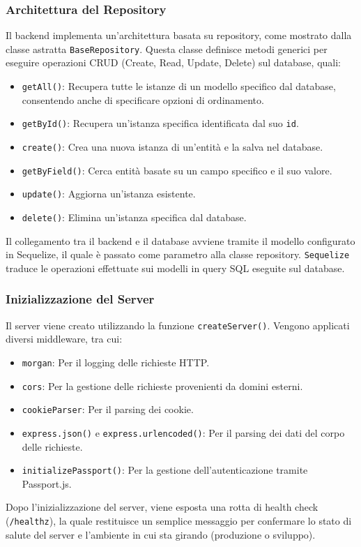 \documentclass[twoside]{supsistudent}
\begin{document}
\subsubsection{Architettura del Repository}
Il backend implementa un'architettura basata su repository, come mostrato dalla classe astratta \texttt{BaseRepository}. Questa classe definisce metodi generici per eseguire operazioni CRUD (Create, Read, Update, Delete) sul database, quali:
\begin{itemize}
  \item \texttt{getAll()}: Recupera tutte le istanze di un modello specifico dal database, consentendo anche di specificare opzioni di ordinamento.
  \item \texttt{getById()}: Recupera un'istanza specifica identificata dal suo \texttt{id}.
  \item \texttt{create()}: Crea una nuova istanza di un'entità e la salva nel database.
  \item \texttt{getByField()}: Cerca entità basate su un campo specifico e il suo valore.
  \item \texttt{update()}: Aggiorna un'istanza esistente.
  \item \texttt{delete()}: Elimina un'istanza specifica dal database.
\end{itemize}
Il collegamento tra il backend e il database avviene tramite il modello configurato in Sequelize, il quale è passato come parametro alla classe repository. \texttt{Sequelize} traduce le operazioni effettuate sui modelli in query SQL eseguite sul database.


\subsubsection{Inizializzazione del Server}
Il server viene creato utilizzando la funzione \texttt{createServer()}. Vengono applicati diversi middleware, tra cui:
\begin{itemize}
  \item \texttt{morgan}: Per il logging delle richieste HTTP.
  \item \texttt{cors}: Per la gestione delle richieste provenienti da domini esterni.
  \item \texttt{cookieParser}: Per il parsing dei cookie.
  \item \texttt{express.json()} e \texttt{express.urlencoded()}: Per il parsing dei dati del corpo delle richieste.
  \item \texttt{initializePassport()}: Per la gestione dell'autenticazione tramite Passport.js.
\end{itemize}
Dopo l'inizializzazione del server, viene esposta una rotta di health check (\texttt{/healthz}), la quale restituisce un semplice messaggio per confermare lo stato di salute del server e l'ambiente in cui sta girando (produzione o sviluppo).
\end{document}
